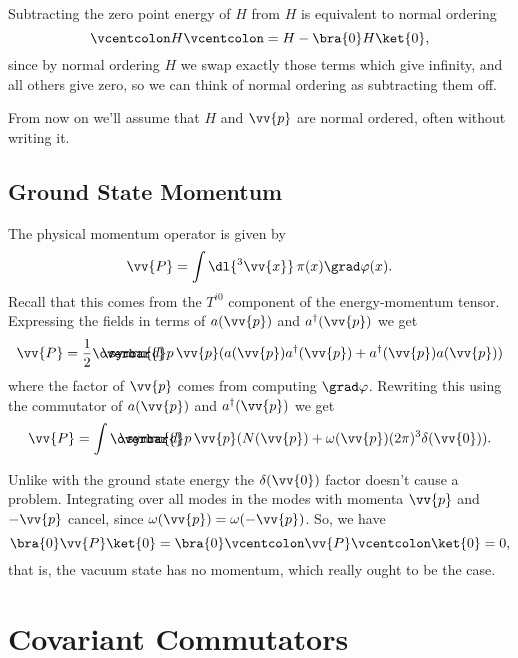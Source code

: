 \documentclass[fleqn]{NotesClass}
\newcommand{\hermit}{{\dagger}}
\newcommand\dbar{\ThisStyle{\ensurestackMath{%
            \stackengine{-.3\LMpt}{\SavedStyle \symrm{d}}{\SavedStyle\overbar{}%
                \mkern2.25mu}{O}{r}{F}{F}{L}}}}
\newcommand{\invariantmeasure}[1]{\dbar #1}
\newcommand{\normalordering}[1]{\mathopen{\vcentcolon}{#1}\mathclose{\vcentcolon}}
\begin{document}
    Subtracting the zero point energy of \(H\) from \(H\) is equivalent to normal ordering
    \begin{equation}
        \normalordering{H} = H - \bra{0} H \ket{0},
    \end{equation}
    since by normal ordering \(H\) we swap exactly those terms which give infinity, and all others give zero, so we can think of normal ordering as subtracting them off.
    
    From now on we'll assume that \(H\) and \(\vv{p}\) are normal ordered, often without writing it.
    
    \section{Ground State Momentum}
    The physical momentum operator is given by
    \begin{equation}
        \vv{P} = \int \dl{^3 \vv{x}} \, \pi(x) \grad\varphi(x).
    \end{equation}
    Recall that this comes from the \(T^{i0}\) component of the energy-momentum tensor.
    Expressing the fields in terms of \(a(\vv{p})\) and \(a^\hermit(\vv{p})\) we get
    \begin{equation}
        \vv{P} = \frac{1}{2} \invariantmeasure{p} \, \vv{p} (a(\vv{p}) a^\hermit(\vv{p}) + a^\hermit(\vv{p})a(\vv{p}))
    \end{equation}
    where the factor of \(\vv{p}\) comes from computing \(\grad\varphi\).
    Rewriting this using the commutator of \(a(\vv{p})\) and \(a^\hermit(\vv{p})\) we get
    \begin{equation}
        \vv{P} = \int \invariantmeasure{p} \, \vv{p}(N(\vv{p}) + \omega(\vv{p})(2\pi)^3\delta(\vv{0})).
    \end{equation}
    
    Unlike with the ground state energy the \(\delta(\vv{0})\) factor doesn't cause a problem.
    Integrating over all modes in the modes with momenta \(\vv{p}\) and \(-\vv{p}\) cancel, since \(\omega(\vv{p}) = \omega(-\vv{p})\).
    So, we have
    \begin{equation}
        \bra{0} \vv{P} \ket{0} = \bra{0} \normalordering{\vv{P}} \ket{0} = 0,
    \end{equation}
    that is, the vacuum state has no momentum, which really ought to be the case.
    
    \chapter{Covariant Commutators}
\end{document}
